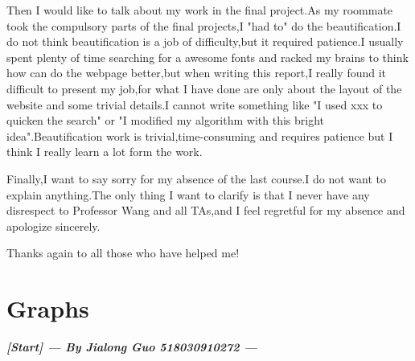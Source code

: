 \documentclass[10pt,twoside,a4paper,titlepage]{article}
\begin{document}
	Then I would like to talk about my work in the final project.As my roommate took the compulsory parts of the final projects,I "had to" do the beautification.I do not think beautification is a job of difficulty,but it required patience.I usually spent plenty of time searching for a awesome fonts and racked my brains to think how can do the webpage better,but when writing this report,I really found it difficult to present my job,for what I have done are only about the layout of the website and some trivial details.I cannot write something like "I used xxx to quicken the search" or "I modified my algorithm with this bright idea".Beautification work is trivial,time-consuming and requires patience but I think I really learn a lot form the work.
	
	Finally,I want to say sorry for my absence of the last course.I do not want to explain anything.The only thing I want to clarify is that I never have any disrespect to Professor Wang and all TAs,and I feel regretful for my absence and apologize sincerely.
	
	Thanks again to all those who have helped me!
	
	
	
	
	
	
	
	
	
	
	
	
		
	
	
	
	
	
	
		
	
	 
	
	
	




\newpage

	\section{Graphs}
		\textbf{\emph{[Start] --- By Jialong Guo 518030910272 ---}}\newline\par
\end{document}
